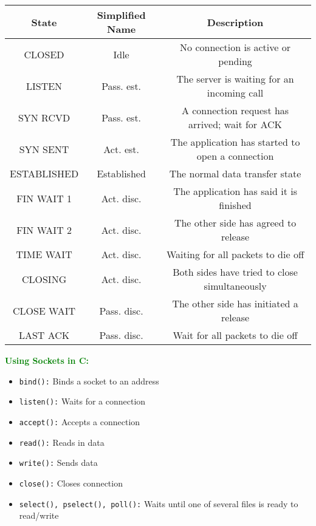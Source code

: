 \documentclass[a4paper,10pt]{article}
\begin{document}
\begin{center}
	\begin{tabular}{ |c|c|c| }
		\hline 
		\textbf{State} &\textbf{Simplified Name} &\textbf{Description} \\
		\hline
		\hline
		CLOSED &Idle &No connection is active or pending \\
		\hline 
		LISTEN &Pass. est. &The server is waiting for an incoming call \\ 
		\hline 
		SYN RCVD &Pass. est. &A connection request has arrived; wait for ACK \\
		\hline 
		SYN SENT &Act. est. &The application has started to open a connection \\ 
		\hline 
		ESTABLISHED &Established &The normal data transfer state \\ 
		\hline 
		FIN WAIT 1 &Act. disc. &The application has said it is finished \\ 
		\hline 
		FIN WAIT 2 &Act. disc. &The other side has agreed to release \\
		\hline 
		TIME WAIT &Act. disc. &Waiting for all packets to die off \\
		\hline 
		CLOSING &Act. disc. &Both sides have tried to close simultaneously \\
		\hline 
		CLOSE WAIT &Pass. disc. &The other side has initiated a release \\ 
		\hline 
		LAST ACK &Pass. disc. &Wait for all packets to die off \\
		\hline  
	\end{tabular}
\end{center}
\textcolor{Green}{\textbf{Using Sockets in C:}}
\begin{itemize}
	\item \texttt{bind():} Binds a socket to an address 
	\item \texttt{listen():} Waits for a connection 
	\item \texttt{accept():} Accepts a connection 
	\item \texttt{read():} Reads in data 
	\item \texttt{write():} Sends data 
	\item \texttt{close():} Closes connection 
	\item \texttt{select(), pselect(), poll():} Waits until one of several files is ready to read/write  
\end{itemize}
\end{document}
